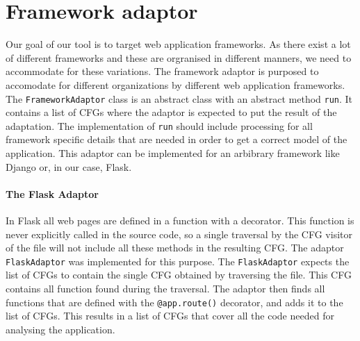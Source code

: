 \section{Framework adaptor}
Our goal of our tool is to target web application frameworks.
As there exist a lot of different frameworks and these are orgranised in different manners, we need to accommodate for these variations.
The framework adaptor is purposed to accomodate for different organizations by different web application frameworks.
The \texttt{FrameworkAdaptor} class is an abstract class with an abstract method \texttt{run}.
It contains a list of CFGs where the adaptor is expected to put the result of the adaptation.
The implementation of \texttt{run} should include processing for all framework specific details that are needed in order to get a correct model of the application.
This adaptor can be implemented for an arbibrary framework like Django or, in our case, Flask.

\paragraph{The Flask Adaptor}
In Flask all web pages are defined in a function with a decorator.
This function is never explicitly called in the source code, so a single traversal by the CFG visitor of the file will not include all these methods in the resulting CFG.
The adaptor \texttt{FlaskAdaptor} was implemented for this purpose.
The \texttt{FlaskAdaptor} expects the list of CFGs to contain the single CFG obtained by traversing the file.
This CFG contains all function found during the traversal.
The adaptor then finds all functions that are defined with the \texttt{@app.route()} decorator, and adds it to the list of CFGs.
This results in a list of CFGs that cover all the code needed for analysing the application.
